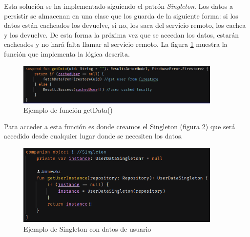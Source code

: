 Esta solución se ha implementado siguiendo el patrón \textit{Singleton}. Los datos a persistir se almacenan en una clase que los guarda de la siguiente forma: si los datos están cacheados los devuelve, si no, los saca del servicio remoto, los cachea y los devuelve. De esta forma la próxima vez que se accedan los datos, estarán cacheados y no hará falta llamar al servicio remoto. La figura \ref{fig:ejemplo_singleton1} muestra la función que implementa la lógica descrita.

\begin{figure}[h]
    \centering
    \includegraphics[width = 0.9\textwidth]{Imagenes/Fuentes/ejemplo_singleton1.png}
    \caption{Ejemplo de función getData()}
    \label{fig:ejemplo_singleton1}
\end{figure}

Para acceder a esta función es donde creamos el Singleton (figura \ref{fig:ejemplo_singleton2}) que será accedido desde cualquier lugar donde se necesiten los datos.
\begin{figure}[h]
    \centering
    \includegraphics[width = 0.9\textwidth]{Imagenes/Fuentes/ejemplo_singleton2.png}
    \caption{Ejemplo de Singleton con datos de usuario}
    \label{fig:ejemplo_singleton2}
\end{figure}
